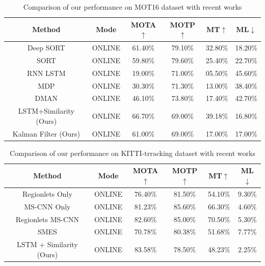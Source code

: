 \begin{table}[h]
	\caption[Results on MOT Dataset]{Comparison  of  our  performance  on  MOT16  dataset  with  recent  works}
	\label{MOT16 Results}
	\begin{center}
		\begin{tabular}{|c||c||c||c||c||c|}
			\hline
			Method & Mode & MOTA$\uparrow$ & MOTP$\uparrow$ & MT$\uparrow$ & ML$\downarrow$\\
			\hline
			Deep SORT \cite{DeepSiam:deepSort} & ONLINE & 61.40\% & 79.10\% & 32.80\% & 18.20\%\\
			\hline
			SORT \cite{DeepSiam:Sort} & ONLINE & 59.80\% & 79.60\% & 25.40\% & 22.70\%\\
			\hline
			RNN LSTM \cite{DeepSiam:multitarget} & ONLINE & 19.00\% & 71.00\% & 05.50\% & 45.60\%\\
			\hline
			MDP \cite{DeepSiam:learntotrack} & ONLINE & 30.30\% & 71.30\% & 13.00\% & 38.40\%\\
			\hline
			DMAN \cite{DeepSiam:attention} & ONLINE & 46.10\% & 73.80\% & 17.40\% & 42.70\%\\
			\hline
			LSTM+Similarity (Ours) & ONLINE & 66.70\% & 69.00\% & 39.18\% & 16.80\%\\
			\hline
			Kalman Filter (Ours) & ONLINE & 61.00\% & 69.00\% & 17.00\% & 17.00\%\\
			\hline
		\end{tabular}
	\end{center}
\end{table}

\begin{table}[h]
	\caption[Results on KITTI dataset]{Comparison  of  our  performance  on  KITTI-trracking  dataset  with  recent  works}
	\label{KITTI Results}
	\begin{center}
		\begin{tabular}{|c||c||c||c||c||c|}
			\hline
			Method & Mode & MOTA$\uparrow$ & MOTP$\uparrow$ & MT$\uparrow$ & ML$\downarrow$\\
			\hline
			Regionlets Only \cite{DeepSiam:kalman} & ONLINE & 76.40\% & 81.50\% & 54.10\% & 9.30\%\\
			\hline
			MS-CNN Only \cite{DeepSiam:kalman} & ONLINE & 81.23\% & 85.60\% & 66.30\% & 4.60\%\\
			\hline
			Regionlets MS-CNN \cite{DeepSiam:kalman} & ONLINE & 82.60\% & 85.00\% & 70.50\% & 5.30\%\\
			\hline
			SMES \cite{DeepSiam:simmap} & ONLINE & 70.78\% & 80.38\% & 51.68\% & 7.77\%\\
			\hline
			LSTM + Similarity (Ours) & ONLINE & 83.58\% & 78.50\% & 48.23\% & 2.25\%\\
			\hline
		\end{tabular}
	\end{center}
\end{table}


